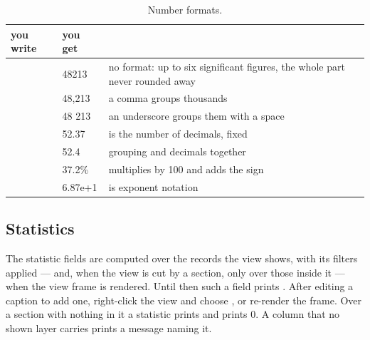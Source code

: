 \begin{table}[htbp]\small
\begin{tabularx}{\linewidth}{@{}llL@{}}\toprule
you write & you get & \\ \midrule
{} & 48213 & no format: up to six significant figures, the whole part never rounded away \\
 & 48,213 & a comma groups thousands \\
 & 48 213 & an underscore groups them with a space \\
 & 52.37 &  is the number of decimals,  fixed \\
 & 52.4 & grouping and decimals together \\
 & 37.2\% & \code{\%} multiplies by 100 and adds the sign \\
 & 6.87e+1 &  is exponent notation \\ \bottomrule
\end{tabularx}
\caption{Number formats.}\label{tab:compo-formats}
\end{table}

\subsection{Statistics}

The statistic fields are computed over the records the view shows, with its filters applied — and, when the view is cut by a section, only over those inside it — when the view frame is rendered. Until then such a field prints . After editing a caption to add one, right-click the view and choose , or re-render the frame. Over a section with nothing in it a statistic prints  and  prints 0. A column that no shown layer carries prints a message naming it.


